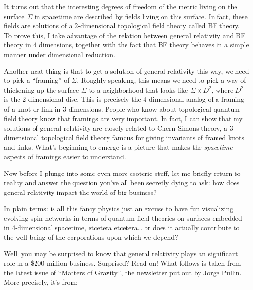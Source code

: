 \documentclass{article}
\def\tightlist{}
\renewcommand{\texttt}[1]{%
  \begingroup
  \ttfamily
  \begingroup\lccode`~=`/\lowercase{\endgroup\def~}{/\discretionary{}{}{}}%
  \begingroup\lccode`~=`[\lowercase{\endgroup\def~}{[\discretionary{}{}{}}%
  \begingroup\lccode`~=`.\lowercase{\endgroup\def~}{.\discretionary{}{}{}}%
  \catcode`/=\active\catcode`[=\active\catcode`.=\active
  \scantokens{#1\noexpand}%
  \endgroup
}
\begin{document}
It turns out that the interesting degrees of freedom of the metric
living on the surface \(\Sigma\) in spacetime are described by fields
living on this surface. In fact, these fields are solutions of a
\(2\)-dimensional topological field theory called BF theory. To prove
this, I take advantage of the relation between general relativity and BF
theory in 4 dimensions, together with the fact that BF theory behaves in
a simple manner under dimensional reduction.

Another neat thing is that to get a solution of general relativity this
way, we need to pick a ``framing'' of \(\Sigma\). Roughly speaking, this
means we need to pick a way of thickening up the surface \(\Sigma\) to a
neighborhood that looks like \(\Sigma\times D^2\), where \(D^2\) is the
\(2\)-dimensional disc. This is precisely the \(4\)-dimensional analog
of a framing of a knot or link in 3-dimensions. People who know about
topological quantum field theory know that framings are very important.
In fact, I can show that my solutions of general relativity are closely
related to Chern-Simons theory, a \(3\)-dimensional topological field
theory famous for giving invariants of framed knots and links. What's
beginning to emerge is a picture that makes the \emph{spacetime} aspects
of framings easier to understand.

Now before I plunge into some even more esoteric stuff, let me briefly
return to reality and answer the question you've all been secretly dying
to ask: how does general relativity impact the world of big business?

In plain terms: is all this fancy physics just an excuse to have fun
visualizing evolving spin networks in terms of quantum field theories on
surfaces embedded in \(4\)-dimensional spacetime, etcetera
etcetera\ldots{} or does it actually contribute to the well-being of the
corporations upon which we depend?

Well, you may be surprised to know that general relativity plays an
significant role in a \$200-million business. Surprised? Read on! What
follows is taken from the latest issue of ``Matters of Gravity'', the
newsletter put out by Jorge Pullin. More precisely, it's from:

\end{document}
